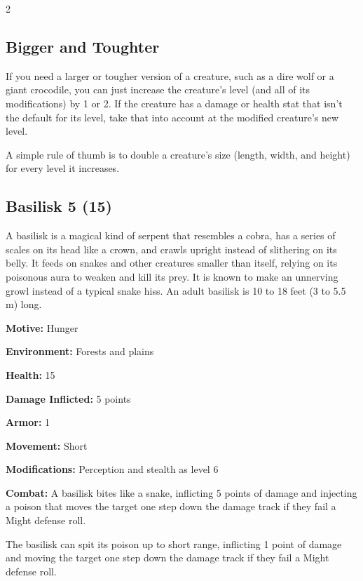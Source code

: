 \begin{multicols}{2}

\subsection{Bigger and Toughter}

If you need a larger or tougher version of a creature, such as a dire wolf or a giant crocodile, you can just increase the creature’s level (and all of its modifications) by 1 or 2. If the creature has a damage or health stat that isn’t the default for its level, take that into account at the modified creature’s new level.

A simple rule of thumb is to double a creature’s size (length, width, and height) for every level it increases.

\subsection{Basilisk 5 (15)}

A basilisk is a magical kind of serpent that resembles a cobra, has a series of scales on its head like a crown, and crawls upright instead of slithering on its belly. It feeds on snakes and other creatures smaller than itself, relying on its poisonous aura to weaken and kill its prey. It is known to make an unnerving growl instead of a typical snake hiss. An adult basilisk is 10 to 18 feet (3 to 5.5 m) long. 

\textbf{Motive:} Hunger 

\textbf{Environment:} Forests and plains 

\textbf{Health:} 15 

\textbf{Damage Inflicted:} 5 points 

\textbf{Armor:} 1 

\textbf{Movement:} Short 

\textbf{Modifications:} Perception and stealth as level 6 

\textbf{Combat:} A basilisk bites like a snake, inflicting 5 points of damage and injecting a poison that moves the target one step down the damage track if they fail a Might defense roll. 

The basilisk can spit its poison up to short range, inflicting 1 point of damage and moving the target one step down the damage track if they fail a Might defense roll. 


\end{multicols}
